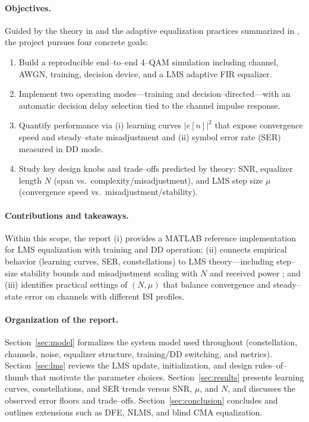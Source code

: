 \documentclass[12pt]{article}
\begin{document}
\paragraph{Objectives.}
Guided by the theory in \cite{haykin,proakis} and the adaptive equalization practices summarized in \cite{qureshi,lucky}, the project pursues four concrete goals:
\begin{enumerate}
  \item Build a reproducible end--to--end 4--QAM simulation including channel, AWGN, training, decision device, and a LMS adaptive FIR equalizer.
  \item Implement two operating modes---training and decision--directed---with an automatic decision delay selection tied to the channel impulse response.
  \item Quantify performance via (i) learning curves $|e[n]|^2$ that expose convergence speed and steady--state misadjustment and (ii) symbol error rate (SER) measured in DD mode.
  \item Study key design knobs and trade--offs predicted by theory: SNR, equalizer length $N$ (span vs.\ complexity/misadjustment), and LMS step size $\mu$ (convergence speed vs.\ misadjustment/stability).
\end{enumerate}

\paragraph{Contributions and takeaways.}
Within this scope, the report (i) provides a MATLAB reference implementation for LMS equalization with training and DD operation; (ii) connects empirical behavior (learning curves, SER, constellations) to LMS theory---including step--size stability bounds and misadjustment scaling with $N$ and received power \cite{haykin}; and (iii) identifies practical settings of $(N,\mu)$ that balance convergence and steady--state error on channels with different ISI profiles.

\paragraph{Organization of the report.}
Section~\ref{sec:model} formalizes the system model used throughout (constellation, channels, noise, equalizer structure, training/DD switching, and metrics). Section~\ref{sec:lms} reviews the LMS update, initialization, and design rules--of--thumb that motivate the parameter choices. Section~\ref{sec:results} presents learning curves, constellations, and SER trends versus SNR, $\mu$, and $N$, and discusses the observed error floors and trade--offs. Section~\ref{sec:conclusion} concludes and outlines extensions such as DFE, NLMS, and blind CMA equalization.
\end{document}
